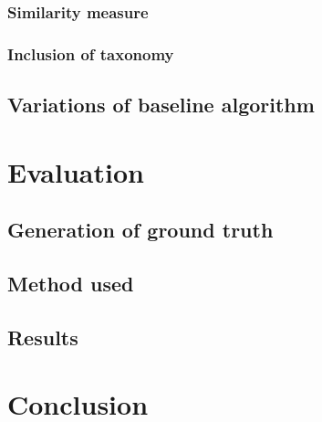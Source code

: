 \documentclass[11pt]{scrartcl} %
\theoremstyle{definition}
\begin{document}
\subsubsection{Similarity measure}
\subsubsection{Inclusion of taxonomy}

\subsection{Variations of baseline algorithm}

\section{Evaluation}

\subsection{Generation of ground truth}

\subsection{Method used}

\subsection{Results}

\section{Conclusion}



\end{document}
